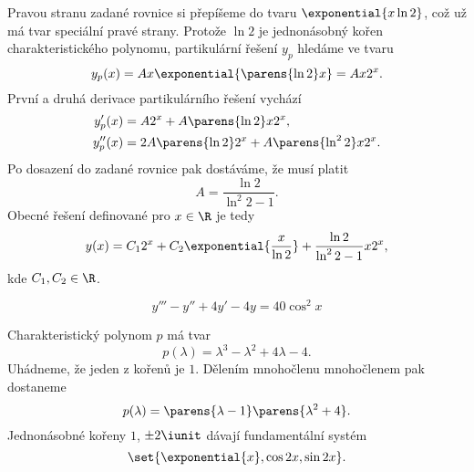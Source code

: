 \documentclass[answers]{exam}
\begin{document}
\begin{questions}
\begin{solution}
  	Pravou stranu zadané rovnice si přepíšeme do tvaru $\exponential{x \ln 2}$, což už má tvar speciální pravé strany. Protože $\ln 2$ je jednonásobný kořen charakteristického polynomu, partikulární řešení $y_p$ hledáme ve tvaru
  	\begin{equation*}
  		y_p(x)
  		=
  		A x \exponential{\parens{\ln 2} x}
  		=
  		A x 2^x.
  	\end{equation*}
  	První a druhá derivace partikulárního řešení vychází
  	\begin{align*}
  		y_p'(x) &= A 2^x + A \parens{\ln 2} x 2^x,
  		\\
  		y_p''(x) &= 2 A \parens{\ln 2} 2^x + A \parens{\ln^2 2} x 2^x.
  	\end{align*}
  	Po dosazení do zadané rovnice pak dostáváme, že musí platit
  	\begin{equation*}
  		A = \frac{\ln 2}{\ln^2 2 - 1}.
  	\end{equation*}
  	Obecné řešení definované pro $x \in \R$ je tedy
  	\begin{equation*}
  		y(x) = C_1 2^x + C_2 \exponential{\frac{x}{\ln 2}} + \frac{\ln 2}{\ln^2 2 - 1} x 2^x,
  	\end{equation*}
  	kde $C_1, C_2 \in \R$.
  \end{solution}

  \question
  \begin{equation*}
    y''' - y'' + 4y' - 4y
    =
    40 \cos^2 x
  \end{equation*}
  
  \begin{solution}
  	Charakteristický polynom $p$ má tvar
  	\begin{equation*}
  		p(\lambda) = \lambda^3 - \lambda^2 + 4 \lambda - 4.
  	\end{equation*}
  	Uhádneme, že jeden z kořenů je $1$. Dělením mnohočlenu mnohočlenem pak dostaneme
  	\begin{equation*}
  		p(\lambda) = \parens{\lambda - 1} \parens{\lambda^2 + 4}.
  	\end{equation*}
  	Jednonásobné kořeny $1$, $\pm 2\iunit$ dávají fundamentální systém
  	\begin{equation*}
  		\set{\exponential{x}, \cos 2x, \sin 2x}.
  	\end{equation*}
  	

\end{solution}
\end{questions}
\end{document}
